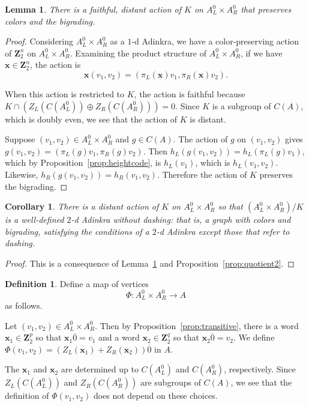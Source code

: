 \documentclass[12pt,twoside,singlespace]{article}
\numberwithin{equation}{section}
\newtheorem{lem}[equation]{Lemma}
\newtheorem{cor}[equation]{Corollary}
\theoremstyle{definition}
\newtheorem{definition}[equation]{Definition}
\newcommand{\ZZ}{\mathbf{Z}}
\renewcommand{\vec}[1]{\mathbf{#1}}
\begin{document}
\begin{lem}
\label{lem:kaction}
There is a faithful, distant action of $K$ on $A_L^0\times A_R^0$ that preserves colors and the bigrading.
\end{lem}
\begin{proof}
Considering $A_L^0\times A_R^0$ as a $1$-d Adinkra, we have a color-preserving action of $\ZZ_2^n$ on $A_L^0\times A_R^0$.  Examining the product structure of $A_L^0\times A_R^0$, if we have $\vec{x}\in \ZZ_2^n$, the action is
\[\vec{x}(v_1,v_2)=(\pi_L(\vec{x})v_1,\pi_R(\vec{x})v_2).\]

When this action is restricted to $K$, the action is faithful because $K\cap (Z_L(C(A_L^0))\oplus Z_R(C(A_R^0)))=0$.  Since $K$ is a subgroup of $C(A)$, which is doubly even, we see that the action of $K$ is distant.

Suppose $(v_1,v_2)\in A_L^0\times A_R^0$ and $g\in C(A)$.  The action of $g$ on $(v_1,v_2)$ gives $g(v_1,v_2)=(\pi_L(g)v_1,\pi_R(g)v_2)$.  Then $h_L(g(v_1,v_2))=h_L(\pi_L(g)v_1)$, which by Proposition~\ref{prop:heightcode}, is $h_L(v_1)$, which is $h_L(v_1,v_2)$.  Likewise, $h_R(g(v_1,v_2))=h_R(v_1,v_2)$.  Therefore the action of $K$ preserves the bigrading.

\end{proof}

\begin{cor}
\label{cor:kquotient}
There is a distant action of $K$ on $A_L^0\times A_R^0$ so that $(A_L^0\times A_R^0)/K$ is a well-defined $2$-d Adinkra without dashing: that is, a graph with colors and bigrading, satisfying the conditions of a $2$-d Adinkra except those that refer to dashing.
\end{cor}
\begin{proof}
This is a consequence of Lemma~\ref{lem:kaction} and Proposition~\ref{prop:quotient2}.
\end{proof}

\begin{definition}
Define a map of vertices
\[\Phi:A_L^0\times A_R^0 \to A\]
as follows.

Let $(v_1,v_2)\in A_L^0\times A_R^0$.  Then by Proposition~\ref{prop:transitive}, there is a word $\vec{x}_1\in \ZZ_2^p$ so that $\vec{x}_1\overline{0}=v_1$ and a word $\vec{x}_2 \in\ZZ_2^q$ so that $\vec{x}_2\overline{0}=v_2$.  We define $\Phi(v_1,v_2)=(Z_L(\vec{x}_1)+Z_R(\vec{x}_2))\overline{0}$ in $A$.

The $\vec{x}_1$ and $\vec{x}_2$ are determined up to $C(A_L^0)$ and $C(A_R^0)$, respectively.  Since $Z_L(C(A_L^0))$ and $Z_R(C(A_R^0))$ are subgroups of $C(A)$, we see that the definition of $\Phi(v_1,v_2)$ does not depend on these choices.
\end{definition}
\end{document}
